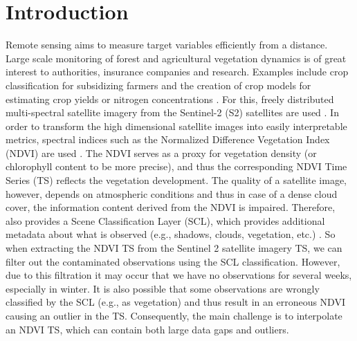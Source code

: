 \chapter{Introduction}

Remote sensing aims to measure target variables efficiently from a distance. 
Large scale monitoring of forest and agricultural vegetation dynamics is of great interest to authorities, insurance companies and research. Examples include crop classification for subsidizing farmers \citep{henitsSentinel2EnablesNationwide2022} and the creation of crop models for estimating crop yields or nitrogen concentrations \citep{couraultSTICSCropModel2021,perichCropNitrogenRetrieval2021}. 
For this, freely distributed multi-spectral satellite imagery from the  Sentinel-2 (S2) satellites are used \citep{esaSentinel22022}.
In order to transform the high dimensional satellite images into easily interpretable metrics, spectral indices such as the Normalized Difference Vegetation Index (NDVI) are used \citep{rouseMonitoringVernalAdvancement1974}. The NDVI serves as a proxy for vegetation density (or chlorophyll content to be more precise), and thus the corresponding {NDVI Time Series ({TS})} reflects the vegetation development. 
The quality of a satellite image, however, depends on atmospheric conditions and thus in case of a dense cloud cover, the information content derived from the NDVI is impaired. Therefore, \cite{esaEuropeanSpaceAgency2022} also provides a Scene Classification Layer (SCL), which provides additional metadata about what is observed (e.g., shadows, clouds, vegetation, etc.) . So when extracting the NDVI {TS} from the Sentinel 2 satellite imagery {TS}, we can filter out the contaminated observations using the SCL classification. However, due to this filtration it may occur that we have no observations for several weeks, especially in winter. It is also possible that some observations are wrongly classified by the SCL (e.g., as vegetation) and thus result in an erroneous NDVI causing an outlier in the TS. Consequently, the main challenge is to interpolate an NDVI {TS}, which can contain both large data gaps and outliers. 

